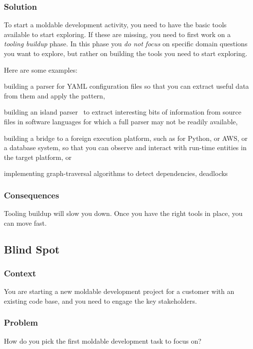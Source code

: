 \documentclass[sigconf]{acmart}
\newcommand{\pattern}[1]{\emph{\nameref{pat:#1}}\xspace}
\begin{document}
\subsubsection*{Solution}
To start a moldable development activity, you need to have the basic tools available to start exploring.
If these are missing, you need to first work on a \emph{tooling buildup} phase.
In this phase you \emph{do not focus} on specific domain questions you want to explore, but rather on building the tools you need to start exploring.

Here are some examples:
\begin{inparaenum}[(i)]
\item building a parser for YAML configuration files so that you can extract useful data from them and apply the \pattern{moldableDataWrapper} pattern,
\item building an island parser~\cite{Kurs14b} to extract interesting bits of information from source files in software languages for which a full parser may not be readily available,
\item building a bridge to a foreign execution platform, such as for Python, or AWS, or a database system, so that you can observe and interact with run-time entities in the target platform, or
\item implementing graph-traversal algorithms to detect dependencies, deadlocks \etc
\end{inparaenum}

\subsubsection*{Consequences}
Tooling buildup will slow you down.
Once you have the right tools in place, you can move fast.

\subsection*{Blind Spot}\label{pat:blindSpot}
\subsubsection*{Context}
You are starting a new moldable development project for a customer with an existing code base, and you need to engage the key stakeholders.

\subsubsection*{Problem}
How do you pick the first moldable development task to focus on?
\end{document}

